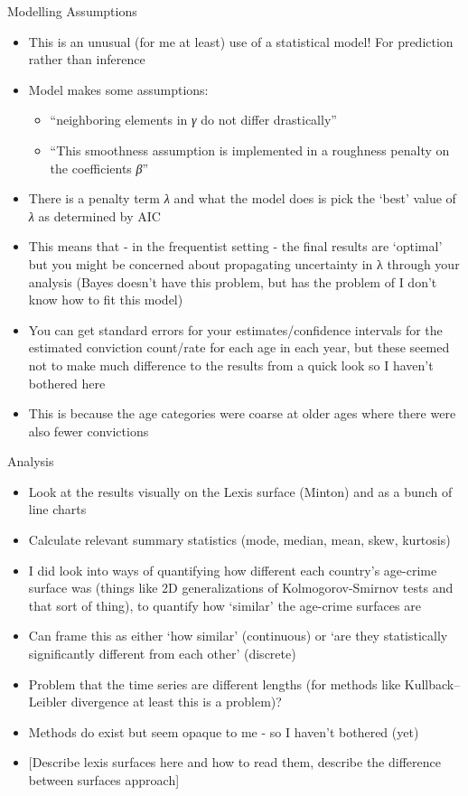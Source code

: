 \documentclass[
  ignorenonframetext,
]{beamer}
\providecommand{\tightlist}{%
  \setlength{\itemsep}{0pt}\setlength{\parskip}{0pt}}\usepackage{longtable,booktabs,array}
\begin{document}
\begin{frame}{Modelling Assumptions}
\protect\hypertarget{modelling-assumptions}{}
\begin{itemize}
\item
  This is an unusual (for me at least) use of a statistical model! For
  prediction rather than inference
\item
  Model makes some assumptions:

  \begin{itemize}
  \tightlist
  \item
    ``neighboring elements in \emph{γ} do not differ drastically''
  \item
    ``This smoothness assumption is implemented in a roughness penalty
    on the coefficients \emph{β}''
  \end{itemize}
\item
  There is a penalty term \emph{λ} and what the model does is pick the
  `best' value of \emph{λ} as determined by AIC
\item
  This means that - in the frequentist setting - the final results are
  `optimal' but you might be concerned about propagating uncertainty in
  λ through your analysis (Bayes doesn't have this problem, but has the
  problem of I don't know how to fit this model)
\item
  You can get standard errors for your estimates/confidence intervals
  for the estimated conviction count/rate for each age in each year, but
  these seemed not to make much difference to the results from a quick
  look so I haven't bothered here
\item
  This is because the age categories were coarse at older ages where
  there were also fewer convictions
\end{itemize}
\end{frame}

\begin{frame}{Analysis}
\protect\hypertarget{analysis}{}
\begin{itemize}
\tightlist
\item
  Look at the results visually on the Lexis surface (Minton) and as a
  bunch of line charts
\item
  Calculate relevant summary statistics (mode, median, mean, skew,
  kurtosis)
\item
  I did look into ways of quantifying how different each country's
  age-crime surface was (things like 2D generalizations of
  Kolmogorov-Smirnov tests and that sort of thing), to quantify how
  `similar' the age-crime surfaces are
\item
  Can frame this as either `how similar' (continuous) or `are they
  statistically significantly different from each other' (discrete)
\item
  Problem that the time series are different lengths (for methods like
  Kullback--Leibler divergence at least this is a problem)?
\item
  Methods do exist but seem opaque to me - so I haven't bothered (yet)
\item
  {[}Describe lexis surfaces here and how to read them, describe the
  difference between surfaces approach{]}
\end{itemize}
\end{frame}
\end{document}
